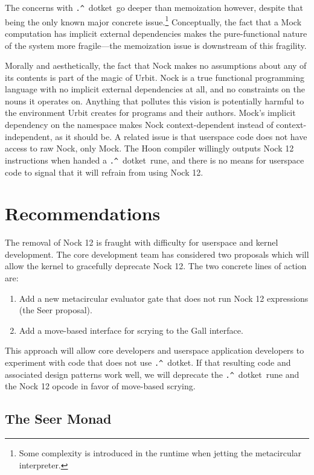 \documentclass[twoside]{article}
\newcommand{\dotket}{\texttt{\string.\string^}~dotket}
\begin{document}
The concerns with \dotket~go deeper than memoization however, despite that being the only known major concrete issue.\footnote{Some complexity is introduced in the runtime when jetting the metacircular interpreter.}  Conceptually, the fact that a Mock computation has implicit external dependencies makes the pure-functional nature of the system more fragile—the memoization issue is downstream of this fragility.

Morally and aesthetically, the fact that Nock makes no assumptions about any of its contents is part of the magic of Urbit.  Nock is a true functional programming language with no implicit external dependencies at all, and no constraints on the nouns it operates on.  Anything that pollutes this vision is potentially harmful to the environment Urbit creates for programs and their authors.  Mock's implicit dependency on the namespace makes Nock context-dependent instead of context-independent, as it should be.  A related issue is that userspace code does not have access to raw Nock, only Mock.  The Hoon compiler willingly outputs Nock 12 instructions when handed a \dotket~rune, and there is no means for userspace code to signal that it will refrain from using Nock 12.


\section{Recommendations}

The removal of Nock 12 is fraught with difficulty for userspace and kernel development.  The core development team has considered two proposals which will allow the kernel to gracefully deprecate Nock 12.  The two concrete lines of action are:

\begin{enumerate}
  \item  Add a new metacircular evaluator gate that does not run Nock 12 expressions (the Seer proposal).
  \item  Add a move-based interface for scrying to the Gall interface.
\end{enumerate}

This approach will allow core developers and userspace application developers to experiment with code that does not use \dotket.  If that resulting code and associated design patterns work well, we will deprecate the \dotket~rune and the Nock 12 opcode in favor of move-based scrying.

\subsection{The Seer Monad}
\end{document}
